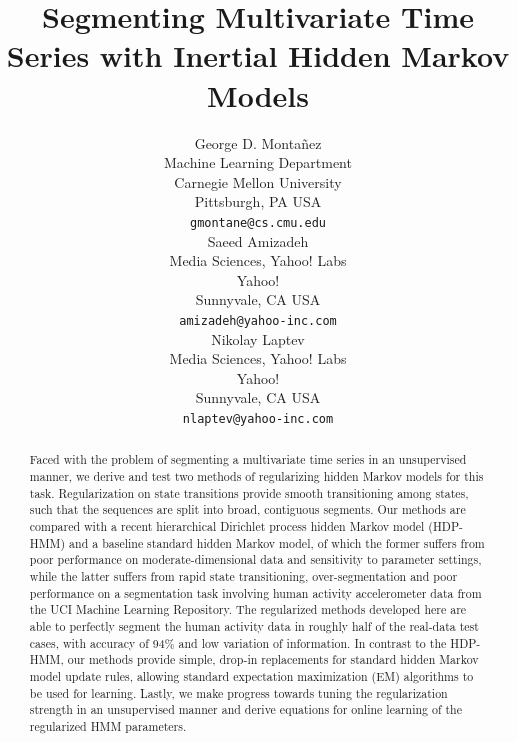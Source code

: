\documentclass[12pt]{article}
\begin{document}
\title{Segmenting Multivariate Time Series with Inertial Hidden Markov Models}

\author{
George D. Monta\~nez \\
Machine Learning Department\\
Carnegie Mellon University\\
Pittsburgh, PA USA\\
\texttt{gmontane@cs.cmu.edu} \\
\And    
Saeed Amizadeh\\
Media Sciences, Yahoo! Labs\\
Yahoo!\\
Sunnyvale, CA USA\\
\texttt{amizadeh@yahoo-inc.com} \\
\And
Nikolay Laptev \\
Media Sciences, Yahoo! Labs\\
Yahoo!\\
Sunnyvale, CA USA\\
\texttt{nlaptev@yahoo-inc.com} \\
}

\maketitle

\begin{abstract}
    Faced with the problem of segmenting a multivariate time series in an unsupervised manner, we derive and test two methods of regularizing hidden Markov models for this task. Regularization on state transitions provide smooth transitioning among states, such that the sequences are split into broad, contiguous segments. Our methods are compared with a recent hierarchical Dirichlet process hidden Markov model (HDP-HMM) and a baseline standard hidden Markov model, of which the former suffers from poor performance on moderate-dimensional data and sensitivity to parameter settings, while the latter suffers from rapid state transitioning, over-segmentation and poor performance on a segmentation task involving human activity accelerometer data from the UCI Machine Learning Repository. The regularized methods developed here are able to perfectly segment the human activity data in roughly half of the real-data test cases, with accuracy of 94\% and low variation of information. In contrast to the HDP-HMM, our methods provide simple, drop-in replacements for standard hidden Markov model update rules, allowing standard expectation maximization (EM) algorithms to be used for learning. Lastly, we make progress towards tuning the regularization strength in an unsupervised manner and derive equations for online learning of the regularized HMM parameters.
\end{abstract}
\end{document}
